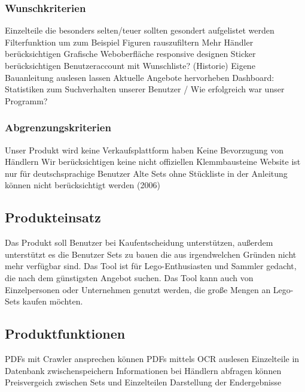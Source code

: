 \subsubsection{Wunschkriterien}
Einzelteile die besonders selten/teuer sollten gesondert aufgelistet werden \newline
Filterfunktion um zum Beispiel Figuren rauszufiltern \newline
Mehr Händler berücksichtigen \newline
Grafische Weboberfläche responsive designen \newline
Sticker berücksichtigen \newline
Benutzeraccount mit Wunschliste? (Historie) \newline
Eigene Bauanleitung auslesen lassen \newline
Aktuelle Angebote hervorheben \newline
Dashboard: Statistiken zum Suchverhalten unserer Benutzer / Wie erfolgreich war unser Programm? \newline

\subsubsection{Abgrenzungskriterien}
Unser Produkt wird keine Verkaufsplattform haben  \newline
Keine Bevorzugung von Händlern \newline
Wir berücksichtigen keine nicht offiziellen Klemmbausteine \newline
Website ist nur für deutschsprachige Benutzer \newline
Alte Sets ohne Stückliste in der Anleitung können nicht berücksichtigt werden (2006) \newline

\subsection{Produkteinsatz}
 Das Produkt soll Benutzer bei Kaufentscheidung unterstützen, außerdem unterstützt es die Benutzer Sets zu bauen die aus irgendwelchen Gründen nicht mehr verfügbar sind.\newline
Das Tool ist für Lego-Enthusiasten und Sammler gedacht, die nach dem günstigsten Angebot suchen. Das Tool kann auch von Einzelpersonen oder Unternehmen genutzt werden, die große Mengen an Lego-Sets kaufen möchten. \newline

\subsection{Produktfunktionen}
PDFs mit Crawler ansprechen können \newline
PDFs mittels OCR auslesen \newline
Einzelteile in Datenbank zwischenspeichern \newline
Informationen bei Händlern abfragen können \newline
Preisvergeich zwischen Sets und Einzelteilen \newline
Darstellung der Endergebnisse \newline

